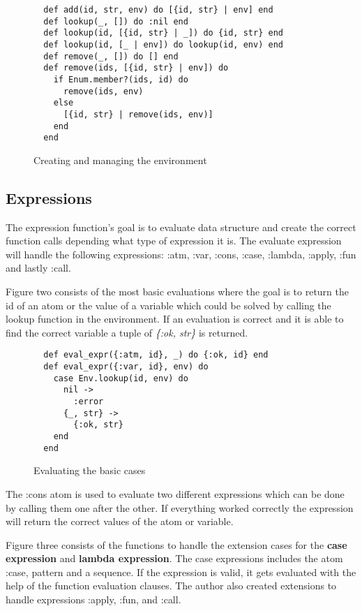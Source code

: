 \documentclass[a4paper,11pt]{article}
\begin{document}
\begin{figure}[H]
\begin{verbatim}
  def add(id, str, env) do [{id, str} | env] end
  def lookup(_, []) do :nil end
  def lookup(id, [{id, str} | _]) do {id, str} end
  def lookup(id, [_ | env]) do lookup(id, env) end
  def remove(_, []) do [] end
  def remove(ids, [{id, str} | env]) do
    if Enum.member?(ids, id) do
      remove(ids, env)
    else
      [{id, str} | remove(ids, env)]
    end
  end
\end{verbatim}
\caption{Creating and managing the environment}
\label{Figure:1}
\end{figure}

\subsection*{Expressions}
The expression function’s goal is to evaluate data structure and create the correct function calls depending what type of expression it is. The evaluate expression will handle the following expressions: :atm, :var, :cons, :case, :lambda, :apply, :fun and lastly :call.

Figure two consists of the most basic evaluations where the goal is to return the id of an atom or the value of a variable which could be solved by calling the lookup function in the environment. If an evaluation is correct and it is able to find the correct variable a tuple of \textit{\{:ok, str\}} is returned.


\begin{figure}[H]
\begin{verbatim}
  def eval_expr({:atm, id}, _) do {:ok, id} end
  def eval_expr({:var, id}, env) do
    case Env.lookup(id, env) do
      nil ->
        :error
      {_, str} ->
        {:ok, str}
    end
  end
\end{verbatim}
\caption{Evaluating the basic cases}
\label{Figure:2}
\end{figure}

The :cons atom is used to evaluate two different expressions which can be done by calling them one after the other. If everything worked correctly the expression will return the correct values of the atom or variable.

Figure three consists of the functions to handle the extension cases for the \textbf{case expression} and \textbf{lambda expression}. The case expressions includes the atom :case, pattern and a sequence. If the expression is valid, it gets evaluated with the help of the function evaluation clauses. The author also created extensions to handle expressions :apply, :fun, and :call. 
\end{document}
